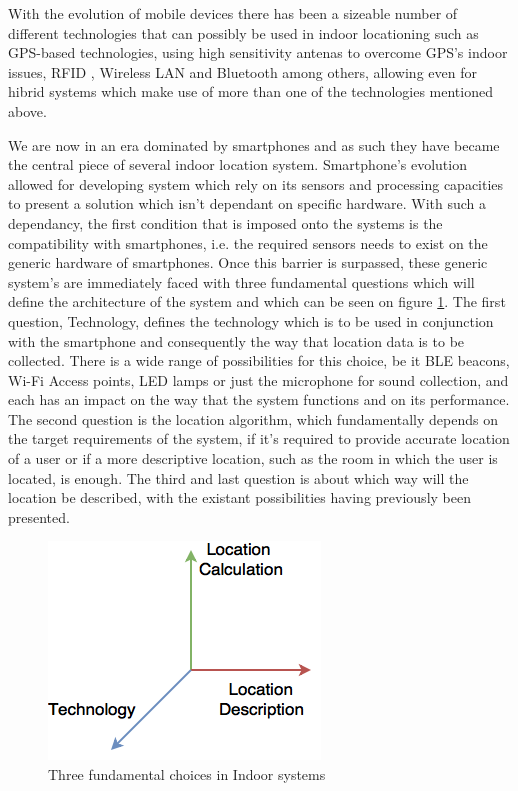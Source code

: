 \documentclass[a4paper]{IEEEtran}
\begin{document}
With the evolution of mobile devices there has been a sizeable number of different technologies that can possibly be used in indoor locationing \cite{surveythesis,survey2} such as GPS-based technologies, using high sensitivity antenas to overcome GPS's indoor issues, RFID , Wireless LAN and Bluetooth among others, allowing even for hibrid systems which make use of more than one of the technologies mentioned above. 


We are now in an era dominated by smartphones and as such they have became the central piece of several indoor location system. Smartphone's evolution allowed for developing system which rely on its sensors and processing capacities to present a solution which isn't dependant on specific hardware. With such a dependancy, the first condition that is imposed onto the systems is the compatibility with smartphones, i.e. the required sensors needs to exist on the generic hardware of smartphones. Once this barrier is surpassed, these generic system's are immediately faced with three fundamental questions which will define the architecture of the system and which can be seen on figure \ref{fig:choices}. The first question, Technology, defines the technology which is to be used in conjunction with the smartphone and consequently the way that location data is to be collected. There is a wide range of possibilities for this choice, be it BLE beacons, Wi-Fi Access points, LED lamps or just the microphone for sound collection, and each has an impact on the way that the system functions and on its performance. The second question is the location algorithm, which fundamentally depends on the target requirements of the system, if it's required to provide accurate location of a user or if a more descriptive location, such as the room in which the user is located, is enough. The third and last question is about which way will the location be described, with the existant possibilities having previously been presented. 

\begin{figure}[htp]
	\centering
		\includegraphics[width=0.5\linewidth]{figures/vectors.png}
	\caption[]{Three fundamental choices in Indoor systems}
	\label{fig:choices}
\end{figure}
\end{document}
